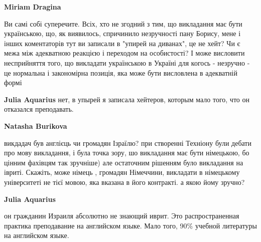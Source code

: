 \begin{itemize}
\begin{itemize}
 
\textbf{Miriam Dragina} 

Ви самі собі суперечите. Всіх, хто не згодний з тим, що викладання має бути
українською, що, як виявилось, спричинило незручності пану Борису, мене і інших
коментаторів тут ви записали в "упирей на диванах", це не хейт? Чи є межа між
адекватною реакцією і переходом на особистості? І може висловити несприйняття
того, що викладати українською в Україні для когось - незручно - це нормальна і
закономірна позиція, яка може бути висловлена в адекватній формі


 
\textbf{Julia Aquarius} нет, в упырей я записала хейтеров, которым мало того, что он отказался преподавать.

 
\textbf{Natasha Burikova} 

викдадач був англієць чи громадян Ізраїлю? при створенні Техніону були дебати
про мову викладання, і була точка зору, шо викладання має бути німецькою, бо
цінним фахівцям так зручніше) але остаточним рішенням було викладання на
івриті. Скажіть, може німець , громадян Німеччини, викладати в німецькому
університеті не тієї мовою, яка вказана в його контракті. а якою йому зручно?


 
\textbf{Julia Aquarius} 

он гражданин Израиля абсолютно не знающий иврит. Это распространенная практика
преподавание на английском языке. Мало того, 90\% учебной литературы на
английском языке.


 

\end{itemize}
\end{itemize}
